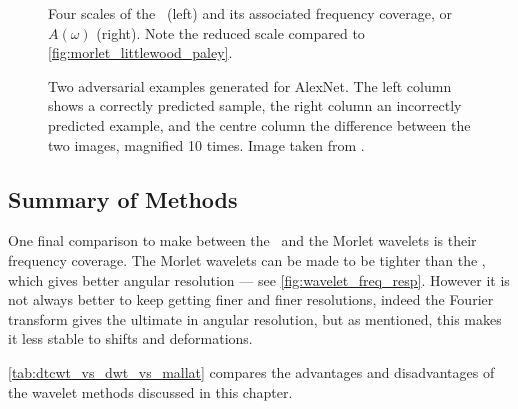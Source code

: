   \begin{figure}
    \subfloat{\makebox[0.6\textwidth][c]{%
    }}
    \subfloat{\makebox[0.4\textwidth][c]{%
    }}
    \caption[\DTCWT\ basis functions and their frequency coverage]
    {Four scales of the \DTCWT\ (left) and its associated frequency
    coverage, or $A(\omega)$ (right). Note the reduced scale compared to \autoref{fig:morlet_littlewood_paley}.}
    \label{fig:dtcwt_lwoodpaley}
  \end{figure}

  \begin{figure}
    \centering
    \caption[Two adversarial examples generated for AlexNet]
    {Two adversarial examples generated for AlexNet. The left column
    shows a correctly predicted sample, the right column an incorrectly
    predicted example, and the centre column the difference between the two
    images, magnified 10 times. Image taken from
    \citep{szegedy_intriguing_2013}.}
    \label{fig:difference}
  \end{figure}
\subsection{Summary of Methods}
  One final comparison to make between the \DTCWT\ and the Morlet wavelets is
  their frequency coverage. The Morlet wavelets can be made to be tighter than
  the \DTCWT, which gives better angular resolution --- see
  \autoref{fig:wavelet_freq_resp}. However it is not always
  better to keep getting finer and finer resolutions, indeed the Fourier
  transform gives the ultimate in angular resolution, but as mentioned, this
  makes it less stable to shifts and deformations. 

  \autoref{tab:dtcwt_vs_dwt_vs_mallat} compares the advantages and
  disadvantages of the wavelet methods discussed in this chapter.

